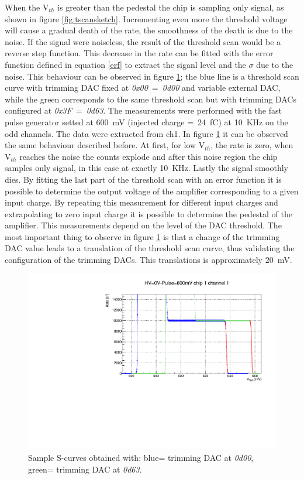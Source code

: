 When the V$_{th}$ is greater than the pedestal the chip is sampling only signal, as shown in figure \ref{fig:tscansketch}.
Incrementing even more the threshold voltage will cause a gradual death of the rate, the smoothness of the death is due to the noise.
If the signal were noiseless, the result of the threshold scan would be a reverse step function.
This decrease in the rate can be fitted with the error function defined in equation \ref{erf} to extract the siganl level and the $\sigma$ due to the noise.
\newline
\noindent This behaviour can be observed in figure \ref{fig:thscanch0}; the blue line is a threshold scan curve with trimming DAC fixed at \textit{0x00}~=~\textit{0d00} and variable external DAC, while the green corresponds to the same threshold scan but with trimming DACs configured at \textit{0x3F}~=~\textit{0d63}.
The measurements were performed with the fast pulse generator setted at 600~mV (injected charge =~24~fC) at 10~KHz on the odd channels. The data were extracted from ch1.
In figure \ref{fig:thscanch0} it can be observed the same behaviour described before.
At first, for low V$_{th}$, the rate is zero, when V$_{th}$ reaches the noise the counts explode and after this noise region the chip samples only signal, in this case at exactly 10~KHz.
Lastly the signal smoothly dies. 
By fitting the last part of the threshold scan with an error function it is possible to determine the output voltage of the amplifier corresponding to a given input charge.
By repeating this measurement for different input charges and extrapolating to zero input charge it is possible to determine the pedestal of the amplifier.
This measurements depend on the level of the DAC threshold.
\noindent The most important thing to observe in figure \ref{fig:thscanch0} is that a change of the trimming DAC value leads to a translation of the threshold scan curve, thus validating the configuration of the trimming DACs.
This translations is approximately 20~mV.
\begin{figure}[H]
	\centering
	\includegraphics[width=0.8\linewidth]{IMG/ch5/DataDacConfig/ThScan_ch0.pdf}
	\caption{Sample S-curves obtained with: {\color{blue}blue}= trimming DAC at \textit{0d00},\\{\color{green}green}= trimming DAC at \textit{0d63}.}
	\label{fig:thscanch0}
\end{figure}

